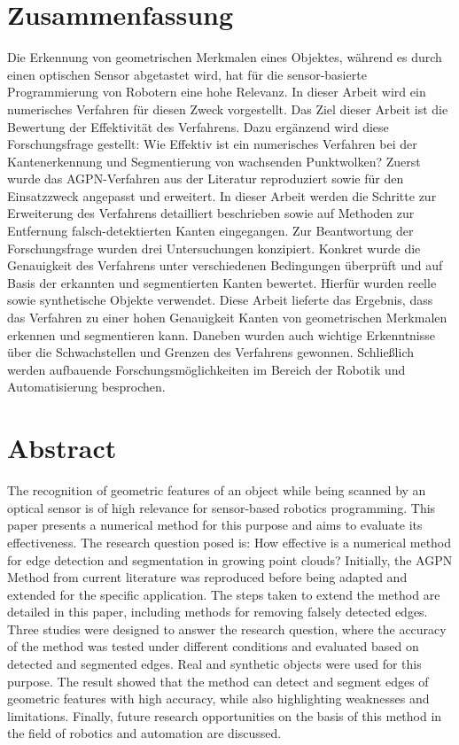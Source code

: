 \section*{\centering Zusammenfassung}
Die Erkennung von geometrischen Merkmalen eines Objektes, während es durch einen optischen Sensor abgetastet wird, hat für die sensor-basierte Programmierung von Robotern eine hohe Relevanz. In dieser Arbeit wird ein numerisches Verfahren für diesen Zweck vorgestellt. Das Ziel dieser Arbeit ist die Bewertung der Effektivität des Verfahrens. Dazu ergänzend wird diese Forschungsfrage gestellt: Wie Effektiv ist ein numerisches Verfahren bei der Kantenerkennung und Segmentierung von wachsenden Punktwolken? Zuerst wurde das AGPN-Verfahren aus der Literatur reproduziert sowie für den Einsatzzweck angepasst und erweitert. In dieser Arbeit werden die Schritte zur Erweiterung des Verfahrens detailliert beschrieben sowie auf Methoden zur Entfernung falsch-detektierten Kanten eingegangen. Zur Beantwortung der Forschungsfrage wurden drei Untersuchungen konzipiert. Konkret wurde die Genauigkeit des Verfahrens unter verschiedenen Bedingungen überprüft und auf Basis der erkannten und segmentierten Kanten bewertet. Hierfür wurden reelle sowie synthetische Objekte verwendet. Diese Arbeit lieferte das Ergebnis, dass das Verfahren zu einer hohen Genauigkeit Kanten von geometrischen Merkmalen erkennen und segmentieren kann. Daneben wurden auch wichtige Erkenntnisse über die Schwachstellen und Grenzen des Verfahrens gewonnen. Schließlich werden aufbauende Forschungsmöglichkeiten im Bereich der Robotik und Automatisierung besprochen.

\section*{\centering Abstract}
The recognition of geometric features of an object while being scanned by an optical sensor is of high relevance for sensor-based robotics programming. This paper presents a numerical method for this purpose and aims to evaluate its effectiveness. The research question posed is: How effective is a numerical method for edge detection and segmentation in growing point clouds? Initially, the AGPN Method from current literature was reproduced before being adapted and extended for the specific application. The steps taken to extend the method are detailed in this paper, including methods for removing falsely detected edges. Three studies were designed to answer the research question, where the accuracy of the method was tested under different conditions and evaluated based on detected and segmented edges. Real and synthetic objects were used for this purpose. The result showed that the method can detect and segment edges of geometric features with high accuracy, while also highlighting weaknesses and limitations. Finally, future research opportunities on the basis of this method in the field of robotics and automation are discussed.
